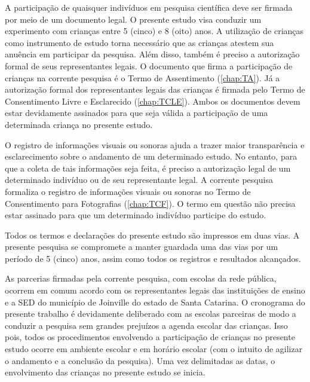 A participação de quaisquer indivíduos em pesquisa científica deve ser firmada por meio de um documento legal. O presente estudo visa conduzir um experimento com crianças entre 5 (cinco) e 8 (oito) anos. A utilização de crianças como instrumento de estudo torna necessário que as crianças atestem sua anuência em participar da pesquisa. Além disso, também é preciso a autorização formal de seus representantes legais. O documento que firma a participação de crianças na corrente pesquisa é o Termo de Assentimento (\autoref{chap:TA}). Já a autorização formal dos representantes legais das crianças é firmada pelo Termo de Consentimento Livre e Esclarecido (\autoref{chap:TCLE}). Ambos os documentos devem estar devidamente assinados para que seja válida a participação de uma determinada criança no presente estudo. 

O registro de informações visuais ou sonoras ajuda a trazer maior transparência e esclarecimento sobre o andamento de um determinado estudo. No entanto, para que a coleta de tais informações seja feita, é preciso a autorização legal de um determinado indivíduo ou de seu representante legal. A corrente pesquisa formaliza o registro de informações visuais ou sonoras no Termo de Consentimento para Fotografias (\autoref{chap:TCF}). O termo em questão não precisa estar assinado para que um determinado indivíduo participe do estudo.


Todos os termos e declarações do presente estudo são impressos em duas vias. A presente pesquisa se compromete a manter guardada uma das vias por um período de 5 (cinco) anos, assim como todos os registros e resultados alcançados. 

As parcerias firmadas pela corrente pesquisa, com escolas da rede pública, ocorrem em comum acordo com os representantes legais das instituições de ensino e a \ac{SED} do município de Joinville do estado de Santa Catarina. O cronograma do presente trabalho é devidamente deliberado com as escolas parceiras de modo a conduzir a pesquisa sem grandes prejuízos a agenda escolar das crianças. Isso pois, todos os procedimentos envolvendo a participação de crianças no presente estudo ocorre em ambiente escolar e em horário escolar (com o intuito de agilizar o andamento e a conclusão da pesquisa). Uma vez delimitadas as datas, o envolvimento das crianças no presente estudo se inicia. 


